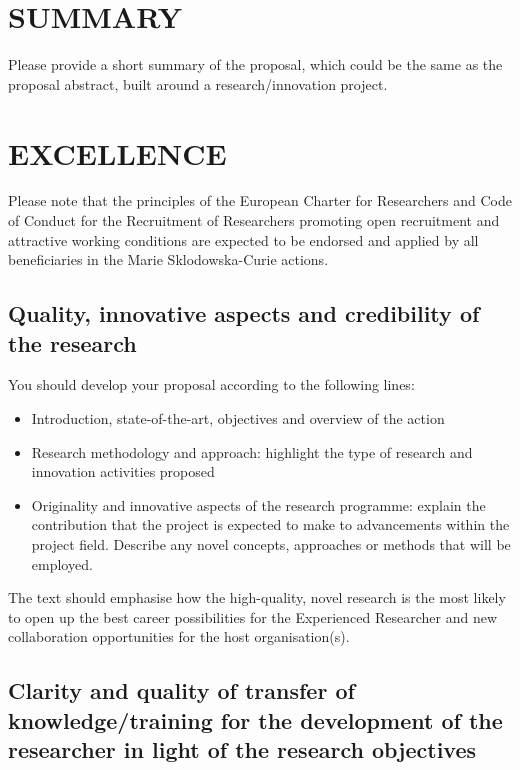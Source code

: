 \documentclass[a4paper,11pt]{article}
\begin{document}
\newpage
\section{SUMMARY}
\label{sec:summary}

Please provide a short summary of the proposal, which could be the same as the proposal abstract, built around a research/innovation project.

\section{EXCELLENCE}
\label{sec:excellence}

Please note that the principles of the European Charter for Researchers and Code of Conduct for the Recruitment of Researchers promoting open recruitment and attractive working conditions are expected to be endorsed and applied by all beneficiaries in the Marie Sklodowska-Curie actions.

\subsection{Quality, innovative aspects and credibility of the research}
\label{sec:quality}

You should develop your proposal according to the following lines:
\begin{itemize}
\item Introduction, state-of-the-art, objectives and overview of the action
\item Research methodology and approach: highlight the type of research and innovation activities proposed
\item Originality and innovative aspects of the research programme: explain the contribution that the project is expected to make to advancements within the project field. Describe any novel concepts, approaches or methods that will be employed.
\end{itemize}
The text should emphasise how the high-quality, novel research is the most likely to open up the best career possibilities for the Experienced Researcher and new collaboration opportunities for the host organisation(s). 

\subsection{Clarity and quality of transfer of knowledge/training for the development of the researcher in light of the research objectives}
\label{sec:transfer}
\end{document}
